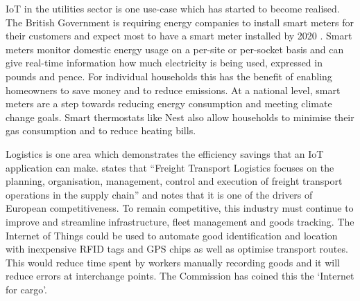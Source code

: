       IoT in the utilities sector is one use-case which has started to become realised. The British Government is requiring energy companies to install smart meters for their customers and expect most to have a smart meter installed by 2020 \citep{DoECC:2013}. Smart meters monitor domestic energy usage on a per-site or per-socket basis and can give real-time information how much electricity is being used, expressed in pounds and pence. For individual households this has the benefit of enabling homeowners to save money and to reduce emissions. At a national level, smart meters are a step towards reducing energy consumption and meeting climate change goals. Smart thermostats like Nest also allow households to minimise their gas consumption and to reduce heating bills.

      Logistics is one area which demonstrates the efficiency savings that an IoT application can make. \citet{ECFreight:2007} states that ``Freight Transport Logistics focuses on the planning, organisation, management, control and execution of freight transport operations in the supply chain'' and notes that it is one of the drivers of European competitiveness. To remain competitive, this industry must continue to improve and streamline infrastructure, fleet management and goods tracking. The Internet of Things could be used to automate good identification and location with inexpensive RFID tags and GPS chips as well as optimise transport routes. This would reduce time spent by workers manually recording goods and it will reduce errors at interchange points. The Commission has coined this the `Internet for cargo'.

